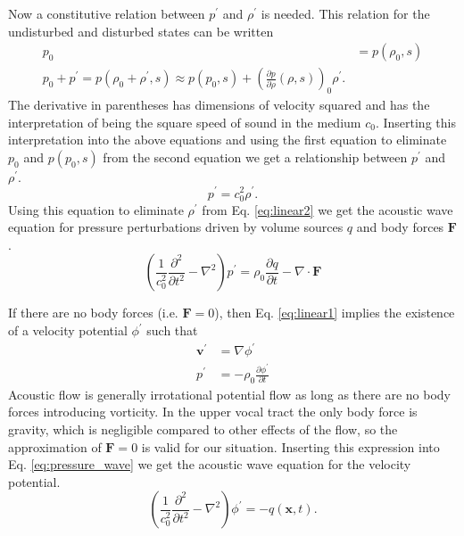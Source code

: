 \documentclass[12pt, letter]{report}
\begin{document}
Now a constitutive relation between $p^{'}$ and $\rho^{'}$ is needed. This relation for the undisturbed and disturbed states can be written
\begin{equation}
\begin{split}
p_0 &= p(\rho_0, s) \\
p_0 + p^{'} = p(\rho_0+\rho^{'},s) \approx p(p_0, s) + \left( \frac{\partial p}{\partial \rho}(\rho,s) \right)_0 \rho^{'}.
\end{split}
\end{equation}
The derivative in parentheses has dimensions of velocity squared and has the interpretation of being the square speed of sound in the medium $c_0$. Inserting this interpretation into the above equations and using the first equation to eliminate $p_0$ and $p(p_0, s)$ from the second equation we get a relationship between $ p^{'}$ and $\rho^{'}$.
\begin{equation} 
p^{'} = c_0^2 \rho^{'}.
\end{equation}
Using this equation to eliminate $\rho^{'}$ from Eq. \ref{eq:linear2} we get the acoustic wave equation for pressure perturbations driven by volume sources $q$ and body forces $\textbf{F}$.
\begin{equation} 
\label{eq:pressure_wave}
\left( \frac{1}{c_0^2}\frac{\partial^2 }{\partial t^2} - \nabla^2 \right)p^{'}=\rho_0 \frac{\partial q}{\partial t} - \nabla \cdot \textbf{F}
\end{equation}

If there are no body forces (i.e. $\textbf{F}=0$), then Eq. \ref{eq:linear1} implies the existence of a velocity potential $\phi^{'}$ such that
\begin{equation}
\label{eq:velocity_potential}
\begin{split}
\textbf{v}^{'} &=\nabla \phi^{'} \\
p^{'} &= -\rho_0 \frac{\partial \phi^{'}}{\partial t}
\end{split}
\end{equation}
Acoustic flow is generally irrotational potential flow as long as there are no body forces introducing vorticity. In the upper vocal tract the only body force is gravity, which is negligible compared to other effects of the flow, so the approximation of $\textbf{F}=0$ is valid for our situation. Inserting this expression into Eq. \ref{eq:pressure_wave} we get the acoustic wave equation for the velocity potential.
\begin{equation}
\label{eq:potential_wave}
\left( \frac{1}{c_0^2}\frac{\partial^2 }{\partial t^2} - \nabla^2 \right)\phi^{'}= -q(\textbf{x}, t).
\end{equation}
\end{document}

